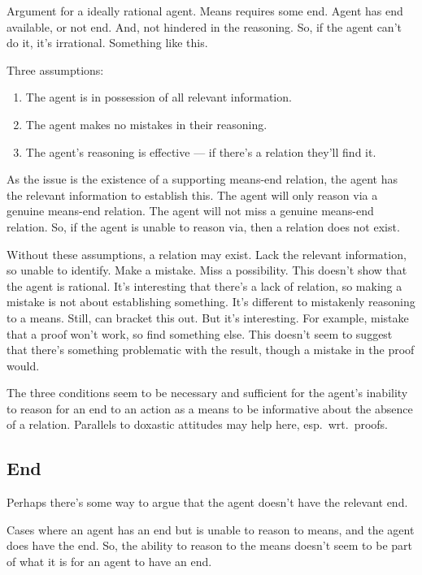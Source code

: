 \documentclass[10pt]{article}
\begin{document}
Argument for a ideally rational agent.
Means requires some end.
Agent has end available, or not end.
And, not hindered in the reasoning.
So, if the agent can't do it, it's irrational.
Something like this.

Three assumptions:
\begin{enumerate}
\item The agent is in possession of all relevant information.
\item The agent makes no mistakes in their reasoning.
\item The agent's reasoning is effective --- if there's a relation they'll find it.
\end{enumerate}

As the issue is the existence of a supporting means-end relation, the agent has the relevant information to establish this.
The agent will only reason via a genuine means-end relation.
The agent will not miss a genuine means-end relation.
So, if the agent is unable to reason via, then a relation does not exist.

Without these assumptions, a relation may exist.
Lack the relevant information, so unable to identify.
Make a mistake.
Miss a possibility.
This doesn't show that the agent is rational.
It's interesting that there's a lack of relation, so making a mistake is not about establishing something.
It's different to mistakenly reasoning to a means.
Still, can bracket this out.
But it's interesting.
For example, mistake that a proof won't work, so find something else.
This doesn't seem to suggest that there's something problematic with the result, though a mistake in the proof would.

\begin{note}
  The three conditions seem to be necessary and sufficient for the agent's inability to reason for an end to an action as a means to be informative about the absence of a relation.
  Parallels to doxastic attitudes may help here, esp.\ wrt.\ proofs.
\end{note}


\subsection{End}
\label{sec:end}

Perhaps there's some way to argue that the agent doesn't have the relevant end.

Cases where an agent has an end but is unable to reason to means, and the agent does have the end.
So, the ability to reason to the means doesn't seem to be part of what it is for an agent to have an end.
\end{document}
